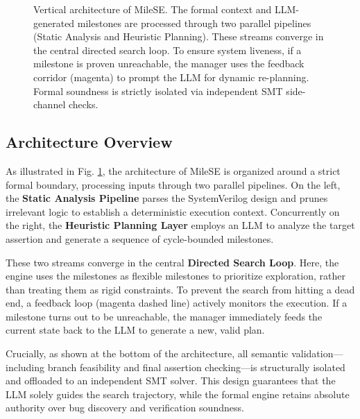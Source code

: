 \documentclass[conference]{IEEEtran}
\begin{document}
\begin{figure}[t]
{%
    }
    \caption{Vertical architecture of MileSE. The formal context and LLM-generated milestones are processed through two parallel pipelines (Static Analysis and Heuristic Planning). These streams converge in the central directed search loop. To ensure system liveness, if a milestone is proven unreachable, the manager uses the feedback corridor (magenta) to prompt the LLM for dynamic re-planning. Formal soundness is strictly isolated via independent SMT side-channel checks.}
    \label{fig:milese_overview}
\end{figure}
\subsection{Architecture Overview}
As illustrated in Fig. \ref{fig:milese_overview}, the architecture of MileSE is organized around a strict formal boundary, processing inputs through two parallel pipelines. On the left, the \textbf{Static Analysis Pipeline} parses the SystemVerilog design and prunes irrelevant logic to establish a deterministic execution context. Concurrently on the right, the \textbf{Heuristic Planning Layer} employs an LLM to analyze the target assertion and generate a sequence of cycle-bounded milestones.

These two streams converge in the central \textbf{Directed Search Loop}. Here, the engine uses the milestones as flexible milestones to prioritize exploration, rather than treating them as rigid constraints. To prevent the search from hitting a dead end, a feedback loop (magenta dashed line) actively monitors the execution. If a milestone turns out to be unreachable, the manager immediately feeds the current state back to the LLM to generate a new, valid plan.

Crucially, as shown at the bottom of the architecture, all semantic validation—including branch feasibility and final assertion checking—is structurally isolated and offloaded to an independent SMT solver. This design guarantees that the LLM solely guides the search trajectory, while the formal engine retains absolute authority over bug discovery and verification soundness.
\end{document}
